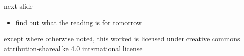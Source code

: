 \documentclass[10pt,t,usenames,dvipsnames]{beamer}
\begin{document}
  \ifnotes\else
  \begin{frame}{next slide}
    \begin{itemize}
      \item find out what the reading is for tomorrow
    \end{itemize}
  \end{frame}
  \fi

  \begin{frame}[c]
    \begin{center}\ccbysa\end{center}

    except where otherwise noted, this worked is licensed under
    \href{http://creativecommons.org/licenses/by-sa/4.0/}{creative commons
    attribution-sharealike 4.0 international license}
  \end{frame}
\end{document}
